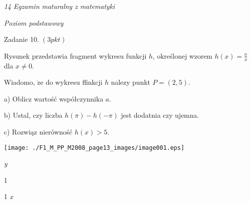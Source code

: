 \documentclass[a4paper,12pt]{article}
\begin{document}
{\it 14 Egzamin maturalny z matematyki}

{\it Poziom podstawowy}

Zadanie 10. $(3pkt)$

Rysunek przedstawia fragment wykresu funkcji $h$, określonej wzorem $h(x)=\displaystyle \frac{a}{x}$ dla $x\neq 0.$

Wiadomo, $\dot{\mathrm{z}}\mathrm{e}$ do wykresu ffinkcji $h$ nalezy punkt $P=(2,5).$

a) Oblicz wartość współczynnika $a.$

b) Ustal, czy liczba $h(\pi)-h(-\pi)$ jest dodatnia czy ujemna.

c) Rozwiąz nierówność $h(x)>5.$
\begin{center}
\texttt{[image: ./F1\_M\_PP\_M2008\_page13\_images/image001.eps]}
\end{center}
{\it y}

1

1  {\it x}
\end{document}
